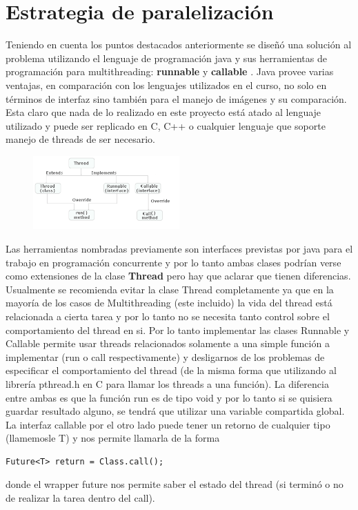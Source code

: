 \documentclass[conference]{IEEEtran}
\begin{document}
\section{Estrategia de paralelización}
Teniendo en cuenta los puntos destacados anteriormente se diseñó una solución al problema utilizando el lenguaje de programación java y sus herramientas de programación para multithreading: \textbf{runnable}\cite{b3} y \textbf{callable} \cite{b4}. Java provee varias ventajas, en comparación con los lenguajes utilizados en el curso, no solo en términos de interfaz sino también para el manejo de imágenes y su comparación. Esta claro que nada de lo realizado en este proyecto está atado al lenguaje utilizado y puede ser replicado en C, C++ o cualquier lenguaje que soporte manejo de threads de ser necesario. \newline

\begin{figure}[h]
  \centering
   \includegraphics[width=0.5\textwidth]{Captura2.png}
 \end{figure}

Las herramientas nombradas previamente son interfaces previstas por java para el trabajo en programación concurrente y por lo tanto ambas clases podrían verse como extensiones de la clase \textbf{Thread} pero hay que aclarar que tienen diferencias. Usualmente se recomienda evitar la clase Thread completamente ya que en la mayoría de los casos de Multithreading (este incluido) la vida del thread está relacionada a cierta tarea y por lo tanto no se necesita tanto control sobre el comportamiento del thread en si. Por lo tanto implementar las clases Runnable y Callable permite usar threads relacionados solamente a una simple función a implementar (run o call respectivamente) y desligarnos de los problemas de especificar el comportamiento del thread (de la misma forma que utilizando al librería pthread.h en C para llamar los threads a una función).
La diferencia entre ambas es que la función run es de tipo void y por lo tanto si se quisiera guardar resultado alguno, se tendrá que utilizar una variable compartida global. La interfaz callable por el otro lado puede tener un retorno de cualquier tipo (llamemosle T) y nos permite llamarla de la forma
\begin{verbatim}
Future<T> return = Class.call();
\end{verbatim}
donde el wrapper future nos permite saber el estado del thread (si terminó o no de realizar la tarea dentro del call). 
\end{document}
